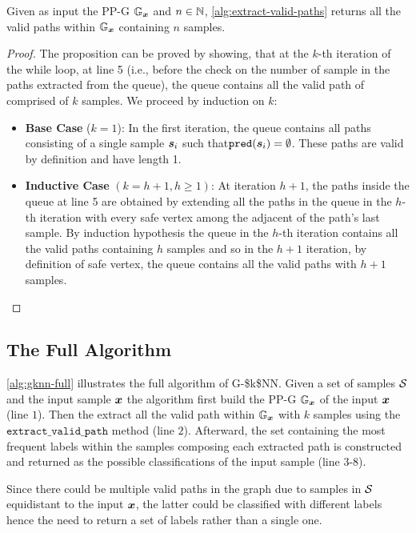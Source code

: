 \begin{proposition}
\label{prop:extract-all-valid-path}
Given as input the \acs{PP-G} $\mathbb{G}_{\bm{x}}$ and $n \in \mathbb{N}$, \autoref{alg:extract-valid-paths} returns all the valid paths within $\mathbb{G}_{\bm{x}}$ containing $n$ samples.
\end{proposition}
\begin{proof}
The proposition can be proved by showing, that at the $k$-th iteration of the while loop, at line 5 (i.e., before the check on the number of sample in the paths extracted from the queue), the queue contains all the valid path of comprised of $k$ samples. We proceed by induction on $k$:
\begin{itemize}
  \item \textbf{Base Case} ($k = 1$): In the first iteration, the queue contains all paths consisting of a single sample $\bm{s}_{i}$ such that$\boldsymbol{\mathtt{pred}}(\bm{s}_{i}) = \emptyset$. These paths are valid by definition and have length 1.
  \item \textbf{Inductive Case} $(k = h+1, h \ge 1)$: At iteration $h+1$, the paths inside the queue at line 5 are obtained by extending all the paths in the queue in the $h$-th iteration with every safe vertex among the adjacent of the path's last sample. By induction hypothesis the queue in the $h$-th iteration contains all the valid paths containing $h$ samples and so in the $h+1$ iteration, by definition of safe vertex, the queue contains all the valid paths with $h+1$ samples.
\end{itemize}
\end{proof}

\subsection{The Full Algorithm}
\label{subsec:gknn-full}

\autoref{alg:gknn-full} illustrates the full algorithm of \acs{G-$k$NN}. Given a set of samples $\mathcal{S}$ and the input sample $\bm{x}$ the algorithm first build the \acs{PP-G} $\mathbb{G}_{\bm{x}}$ of the input $\bm{x}$ (line $1$). Then the extract all the valid path within $\mathbb{G}_{\bm{x}}$ with $k$ samples using the $\mathtt{extract\_valid\_path}$ method (line $2$). Afterward, the set containing the most frequent labels within the samples composing each extracted path is constructed and returned as the possible classifications of the input sample (line $3$-$8$).

Since there could be multiple valid paths in the graph due to samples in $\mathcal{S} $ equidistant to the input $\bm{x}$, the latter could be classified with different labels hence the need to return a set of labels rather than a single one.

